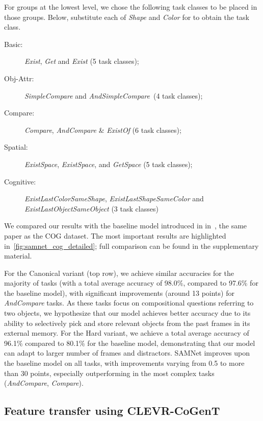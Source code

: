 For groups at the lowest level, we chose the following task classes to be placed in those groups.
Below, substitute each of \textit{Shape} and \textit{Color} for  \uX{} to obtain the task class.
\begin{description}
	\item[Basic:] \textit{Exist}\uX, \textit{Get}\uX{} and \textit{Exist} (5 task classes);
	\item[Obj-Attr:] \emph{SimpleCompare}\uX{} and \textit{AndSimpleCompare}\uX\ (4 task classes);
	\item[Compare:] \textit{Compare}\uX,  \textit{AndCompare}\uX{} \& \textit{Exist}\uX\textit{Of} (6 task classes);
	\item[Spatial:] \textit{ExistSpace}, \textit{Exist}\uX\textit{Space}, and \textit{Get}\uX\textit{Space} (5 task classes);
	\item[Cognitive:] \textit{ExistLastColorSameShape}, \textit{ExistLastShapeSameColor} and \textit{ExistLastObjectSameObject} (3 task classes)
\end{description}


We compared our results with the baseline model introduced in in~\cite{yang2018dataset}, the same paper as the COG dataset.
The most important results are highlighted in~\cref{fig:samnet_cog_detailed}; full comparison can be found in the supplementary material.

For the Canonical variant (top row), we achieve similar accuracies for the majority of tasks (with a total average accuracy of 98.0\%, compared to 97.6\% for the baseline model), with significant improvements (around 13 points) for \textit{AndCompare} tasks.
As these tasks focus on compositional questions referring to two objects, we hypothesize that our model achieves better accuracy due to its ability to selectively pick and store relevant objects from the past frames in its external memory.
For the Hard variant, we achieve a total average accuracy of 96.1\% compared to 80.1\% for the baseline model, demonstrating that our model can adapt to larger number of frames and distractors.
SAMNet improves upon the baseline model on all tasks, with improvements varying from 0.5 to more than 30 points, especially outperforming in the most complex tasks (\textit{AndCompare}\uX, \textit{Compare}\uX).


\subsection{Feature transfer using CLEVR-CoGenT}
\label{sec:feature}

